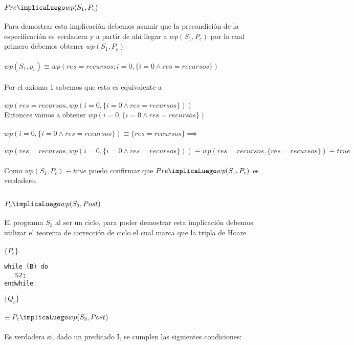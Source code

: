\documentclass[10pt,a4paper]{article}
\begin{document}
\subsection{$Pre\implicaLuego wp(S_1, P_c)$}
Para demostrar esta implicación debemos asumir que la precondición de la especificación es verdadera y a partir de ahí llegar a $wp(S_1, P_c)$ por lo cual primero debemos obtener $wp(S_1, P_c)$\\\\ 
$wp(S_1, p_c)\equiv wp(res = recursos; i = 0, \lbrace i=0 \land res = recursos\rbrace)$
\\\\ Por el axioma 1 sabemos que esto es equivalente a\\\\
$wp(res = recursos, wp(i = 0, \lbrace i=0 \land res = recursos\rbrace))$\\
Entonces vamos a obtener $wp(i = 0, \lbrace i=0 \land res = recursos\rbrace)$\\\\
$wp(i = 0, \lbrace i=0 \land res = recursos\rbrace) \equiv \lbrace res = recursos\rbrace \implies$ \\\\
$wp(res = recursos, wp(i = 0, \lbrace i=0 \land res = recursos\rbrace)) \equiv wp(res = recursos, \lbrace res = recursos\rbrace) \equiv true$ \\\\
Como $wp(S_1, P_c) \equiv true$ puedo confirmar que $Pre \implicaLuego wp(S_1, P_c)$ es verdadero.

\subsection{$P_c\implicaLuego wp(S_3, Post)$}
El programa $S_3$ al ser un ciclo, para poder demostrar esta implicación debemos utilizar el teorema de corrección de ciclo el cual marca que la tripla de Hoare 
\\\\ $\lbrace$$P_{c}$$\rbrace$
  	\begin{lstlisting}[label=code:s]
while (B) do 
   S2;
endwhile
	\end{lstlisting} 
$\lbrace$$Q_{c}$$\rbrace$\\\\
$\equiv P_c\implicaLuego wp(S_3, Post)$ \\\\
Es verdadera si, dado un predicado I, se cumplen las siguientes condiciones:
\end{document}
